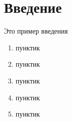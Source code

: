 \chapter*{Введение}
Это пример введения

\begin{enumerate}
    \item пунктик
    \item пунктик
    \item пунктик
    \item пунктик
    \item пунктик
\end{enumerate}

